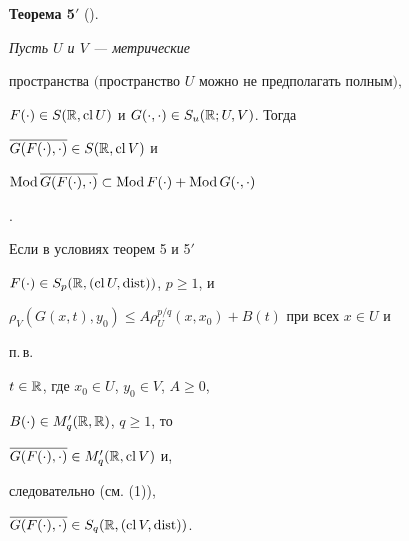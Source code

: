 {\bf Теорема 5$'$} (\cite{10}). {\it Пусть $U$ и $V$ --- метрические


пространства $($пространство $U$ можно не предполагать полным$),$


$F(\cdot)\in S(\Bbb R,\cl U)$ и $G(\cdot,\cdot)\in


S_u(\Bbb R;U,V)$. Тогда


$\overline{G(F(\cdot),\cdot)}\in S(\Bbb R,\operatorname{cl} V)$ и


$\Mod\overline{G(F(\cdot),\cdot)}\subset


\Mod F(\cdot)+\Mod G(\cdot,\cdot)$}.


\medskip





Если в условиях теорем 5 и 5$'$\;


$F(\cdot)\in S_p(\Bbb R,(\operatorname{cl} U,\operatorname{dist}))$, $p\ge 1$, и


$\rho_V(G(x,t),y_0)\le A\rho^{p/q}_U(x,x_0)+B(t)$ при всех $x\in U$ и


п.\,в.


$t\in\Bbb R$, где $x_0\in U$, $y_0\in V$, $A\ge 0$,


$B(\cdot)\in M'_q(\Bbb R,\Bbb R)$, $q\ge 1$, то


$\overline{G(F(\cdot),\cdot)}\in M'_q(\Bbb R,\operatorname{cl} V)$ и,


следовательно (см. (1)),


$\overline{G(F(\cdot),\cdot)}\in S_q(\Bbb R,(\operatorname{cl} V,\operatorname{dist}))$.





